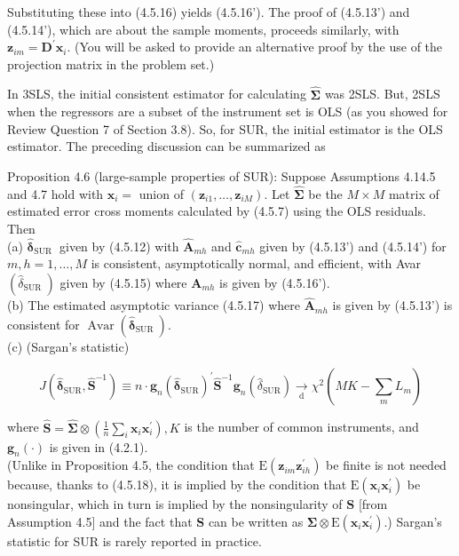 \documentclass[10pt]{article}
\begin{document}
Substituting these into (4.5.16) yields (4.5.16'). The proof of (4.5.13') and (4.5.14'), which are about the sample moments, proceeds similarly, with $\mathbf{z}_{i m}=\mathbf{D}^{\prime} \mathbf{x}_{i}$. (You will be asked to provide an alternative proof by the use of the projection matrix in the problem set.)

In 3SLS, the initial consistent estimator for calculating $\widehat{\mathbf{\Sigma}}$ was 2SLS. But, 2SLS when the regressors are a subset of the instrument set is OLS (as you showed for Review Question 7 of Section 3.8). So, for SUR, the initial estimator is the OLS estimator. The preceding discussion can be summarized as

Proposition 4.6 (large-sample properties of SUR): Suppose Assumptions 4.14.5 and 4.7 hold with $\mathbf{x}_{i}=$ union of $\left(\mathbf{z}_{i 1}, \ldots, \mathbf{z}_{i M}\right)$. Let $\widehat{\mathbf{\Sigma}}$ be the $M \times M$ matrix of estimated error cross moments calculated by (4.5.7) using the OLS residuals. Then\\
(a) $\hat{\boldsymbol{\delta}}_{\text {SUR }}$ given by (4.5.12) with $\widehat{\mathbf{A}}_{m h}$ and $\hat{\mathbf{c}}_{m h}$ given by (4.5.13') and (4.5.14') for $m, h=1, \ldots, M$ is consistent, asymptotically normal, and efficient, with Avar $\left(\hat{\delta}_{\text {SUR }}\right)$ given by (4.5.15) where $\mathbf{A}_{m h}$ is given by (4.5.16').\\
(b) The estimated asymptotic variance (4.5.17) where $\widehat{\mathbf{A}}_{m h}$ is given by (4.5.13') is consistent for $\operatorname{Avar}\left(\hat{\boldsymbol{\delta}}_{\text {SUR }}\right)$.\\
(c) (Sargan's statistic)

$$
J\left(\hat{\boldsymbol{\delta}}_{\mathrm{SUR}}, \widehat{\mathbf{S}}^{-1}\right) \equiv n \cdot \mathbf{g}_{n}\left(\hat{\boldsymbol{\delta}}_{\mathrm{SUR}}\right)^{\prime} \widehat{\mathbf{S}}^{-1} \mathbf{g}_{n}\left(\hat{\delta}_{\mathrm{SUR}}\right) \underset{\mathrm{d}}{\rightarrow} \chi^{2}\left(M K-\sum_{m} L_{m}\right)
$$

where $\widehat{\mathbf{S}}=\widehat{\mathbf{\Sigma}} \otimes\left(\frac{1}{n} \sum_{i} \mathbf{x}_{i} \mathbf{x}_{i}^{\prime}\right), K$ is the number of common instruments, and $\mathbf{g}_{n}(\cdot)$ is given in (4.2.1).\\
(Unlike in Proposition 4.5, the condition that $\mathrm{E}\left(\mathbf{z}_{i m} \mathbf{z}_{i h}^{\prime}\right)$ be finite is not needed because, thanks to (4.5.18), it is implied by the condition that $\mathrm{E}\left(\mathbf{x}_{i} \mathbf{x}_{i}^{\prime}\right)$ be nonsingular, which in turn is implied by the nonsingularity of $\mathbf{S}$ [from Assumption 4.5] and the fact that $\mathbf{S}$ can be written as $\boldsymbol{\Sigma} \otimes \mathrm{E}\left(\mathbf{x}_{i} \mathbf{x}_{i}^{\prime}\right)$.) Sargan's statistic for SUR is rarely reported in practice.
\end{document}
